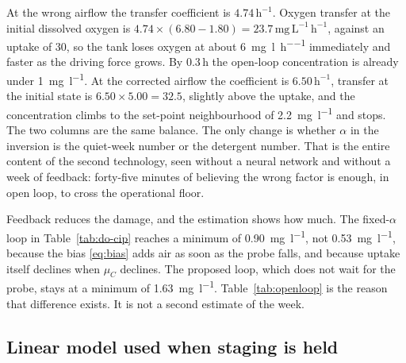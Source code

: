 At the wrong airflow the transfer coefficient is $4.74\,\mathrm{h^{-1}}$. Oxygen transfer at the initial dissolved oxygen is $4.74\times(6.80-1.80)=23.7\,\mathrm{mg\,L^{-1}\,h^{-1}}$, against an uptake of $30$, so the tank loses oxygen at about \SI{6}{\milli\gram\per\litre\per\hour} immediately and faster as the driving force grows. By $0.3\,\mathrm{h}$ the open-loop concentration is already under \SI{1}{\milli\gram\per\litre}. At the corrected airflow the coefficient is $6.50\,\mathrm{h^{-1}}$, transfer at the initial state is $6.50\times 5.00=32.5$, slightly above the uptake, and the concentration climbs to the set-point neighbourhood of \SI{2.2}{\milli\gram\per\litre} and stops. The two columns are the same balance. The only change is whether $\alpha$ in the inversion is the quiet-week number or the detergent number. That is the entire content of the second technology, seen without a neural network and without a week of feedback: forty-five minutes of believing the wrong factor is enough, in open loop, to cross the operational floor.

Feedback reduces the damage, and the estimation shows how much. The fixed-$\alpha$ loop in Table~\ref{tab:do-cip} reaches a minimum of \SI{0.90}{\milli\gram\per\litre}, not \SI{0.53}{\milli\gram\per\litre}, because the bias \eqref{eq:bias} adds air as soon as the probe falls, and because uptake itself declines when $\mu_{C}$ declines. The proposed loop, which does not wait for the probe, stays at a minimum of \SI{1.63}{\milli\gram\per\litre}. Table~\ref{tab:openloop} is the reason that difference exists. It is not a second estimate of the week.

\subsection{Linear model used when staging is held}

